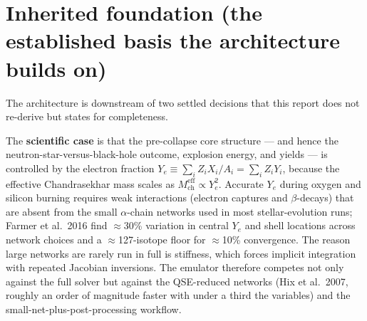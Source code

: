 \documentclass[11pt]{article}
\newcommand{\Ye}{Y_{e}}
\begin{document}
\begin{abstract}
All three citation bases survived hostile, line-by-line verification with no hallucinated load-bearing references; the corrections required were matters of attribution, labeling, and internal consistency, and are incorporated silently here. What the audits leave standing are a small number of genuine, load-bearing uncertainties that no literature can resolve and that define the project's Phase-0 measurement program: whether size transfer to chemically new neutron-rich isotopes holds, whether the per-step $\Ye$ residual accumulates systematically or as a random walk (which moves the pass/fail gate by two orders of magnitude), whether error distributions measured on quasi-random Sobol compositions transfer to the thin manifold of real MESA trajectories, whether the trajectory-varying equilibrium mask is stable enough for rollout training, and whether the asinh latent and the out-of-regime rollout governor behave at silicon-burning dynamic range. The overall verdict across the three audits is consistent: the architecture is sound and the niche is open as of mid-June 2026; commit to the design conditionally, with the measurements above as gates and with explicit thresholds at which to switch the target, the processor, the mask, or the temporal head rather than persist.
\end{abstract}

\section{Inherited foundation (the established basis the architecture builds on)}

The architecture is downstream of two settled decisions that this report does not re-derive but states for completeness.

The \textbf{scientific case} is that the pre-collapse core structure --- and hence the neutron-star-versus-black-hole outcome, explosion energy, and yields --- is controlled by the electron fraction $\Ye \equiv \sum_i Z_i X_i / A_i = \sum_i Z_i Y_i$, because the effective Chandrasekhar mass scales as $M_{\mathrm{ch}}^{\mathrm{eff}} \propto \Ye^{2}$. Accurate $\Ye$ during oxygen and silicon burning requires weak interactions (electron captures and $\beta$-decays) that are absent from the small $\alpha$-chain networks used in most stellar-evolution runs; Farmer et al.\ 2016 find $\approx$30\% variation in central $\Ye$ and shell locations across network choices and a $\approx$127-isotope floor for $\approx$10\% convergence. The reason large networks are rarely run in full is stiffness, which forces implicit integration with repeated Jacobian inversions. The emulator therefore competes not only against the full solver but against the QSE-reduced networks (Hix et al.\ 2007, roughly an order of magnitude faster with under a third the variables) and the small-net-plus-post-processing workflow.
\end{document}
